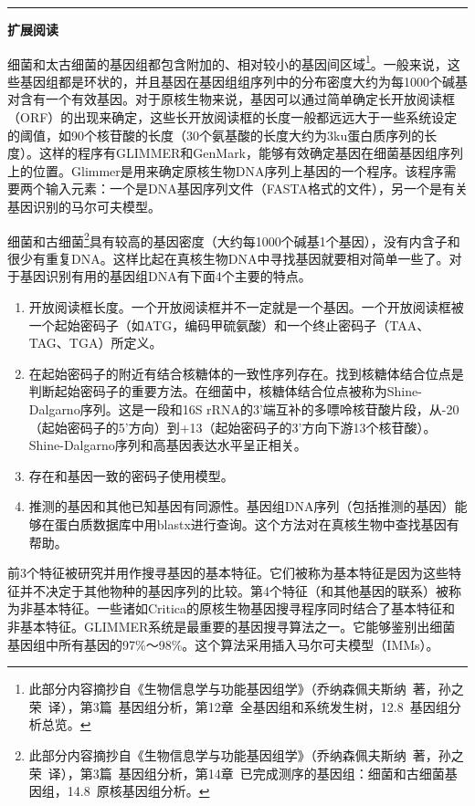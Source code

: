 \documentclass[11pt,a4paper,twoside]{book}
\begin{document}
\vspace{0.5cm}
\hrule height 3pt

\noindent
{\large \bfseries \HandPencilLeft 扩展阅读}

{\small
细菌和太古细菌的基因组都包含附加的、相对较小的基因间区域\footnote{此部分内容摘抄自《生物信息学与功能基因组学》（乔纳森\textbullet 佩夫斯纳\ 著，孙之荣\ 译），第3篇\ 基因组分析，第12章\ 全基因组和系统发生树，12.8\ 基因组分析总览。}。一般来说，这些基因组都是环状的，并且基因在基因组组序列中的分布密度大约为每1000个碱基对含有一个有效基因。对于原核生物来说，基因可以通过简单确定长开放阅读框（ORF）的出现来确定，这些长开放阅读框的长度一般都远远大于一些系统设定的阈值，如90个核苷酸的长度（30个氨基酸的长度大约为3ku蛋白质序列的长度）。这样的程序有GLIMMER和GenMark，能够有效确定基因在细菌基因组序列上的位置。Glimmer是用来确定原核生物DNA序列上基因的一个程序。该程序需要两个输入元素：一个是DNA基因序列文件（FASTA格式的文件），另一个是有关基因识别的马尔可夫模型。

细菌和古细菌\footnote{此部分内容摘抄自《生物信息学与功能基因组学》（乔纳森\textbullet 佩夫斯纳\ 著，孙之荣\ 译），第3篇\ 基因组分析，第14章\ 已完成测序的基因组：细菌和古细菌基因组，14.8\ 原核基因组分析。}具有较高的基因密度（大约每1000个碱基1个基因），没有内含子和很少有重复DNA。这样比起在真核生物DNA中寻找基因就要相对简单一些了。对于基因识别有用的基因组DNA有下面4个主要的特点。
\begin{enumerate}
  \item 开放阅读框长度。一个开放阅读框并不一定就是一个基因。一个开放阅读框被一个起始密码子（如ATG，编码甲硫氨酸）和一个终止密码子（TAA、TAG、TGA）所定义。
  \item 在起始密码子的附近有结合核糖体的一致性序列存在。找到核糖体结合位点是判断起始密码子的重要方法。在细菌中，核糖体结合位点被称为Shine-Dalgarno序列。这是一段和16S rRNA的3'端互补的多嘌呤核苷酸片段，从-20（起始密码子的5'方向）到+13（起始密码子的3'方向下游13个核苷酸）。Shine-Dalgarno序列和高基因表达水平呈正相关。
  \item 存在和基因一致的密码子使用模型。
  \item 推测的基因和其他已知基因有同源性。基因组DNA序列（包括推测的基因）能够在蛋白质数据库中用blastx进行查询。这个方法对在真核生物中查找基因有帮助。
\end{enumerate}
前3个特征被研究并用作搜寻基因的基本特征。它们被称为基本特征是因为这些特征并不决定于其他物种的基因序列的比较。第4个特征（和其他基因的联系）被称为非基本特征。一些诸如Critica的原核生物基因搜寻程序同时结合了基本特征和非基本特征。GLIMMER系统是最重要的基因搜寻算法之一。它能够鉴别出细菌基因组中所有基因的97\%～98\%。这个算法采用插入马尔可夫模型（IMMs）。

}
\end{document}
